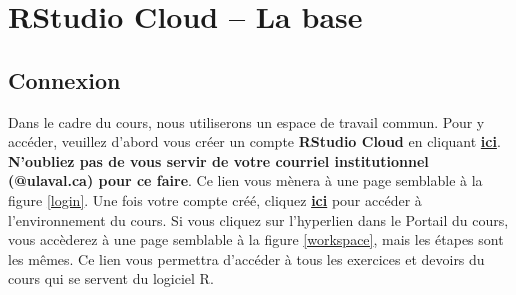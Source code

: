 \documentclass[10.5pt,a4paper]{article}
\begin{document}
\section{RStudio Cloud -- La base}
  \subsection{Connexion}
  Dans le cadre du cours, nous utiliserons un espace de travail commun. Pour y accéder, veuillez d'abord vous créer un compte \textbf{RStudio Cloud} en cliquant \href{https://login.rstudio.cloud/register?redirect=https\%3A\%2F\%2Fclient.login.rstudio.cloud\%2Foauth\%2Flogin\%3Fshow_auth\%3D0\%26show_login\%3D0\%26show_setup\%3D0}{\textbf{ici}}. \textbf{N'oubliez pas de vous servir de votre courriel institutionnel (@ulaval.ca) pour ce faire}. Ce lien vous mènera à une page semblable à la figure \ref{login}. Une fois votre compte créé, cliquez \href{https://can01.safelinks.protection.outlook.com/?url=https\%3A\%2F\%2Flogin.rstudio.cloud\%2Finvite\%3Fspace_name\%3DPOL\%2B2000-Z\%2BM\%25C3\%25A9thodes\%2Bquantitatives\%26code\%3D9tltN\%252ByVLqitCL1rVgCB\%252F\%252B0V8rk0Wtqxp\%252Fl6uW8J&amp;data=04\%7C01\%7Cwilliam.poirier.1\%40ulaval.ca\%7C9119a0b3a3fa4119007208d987439312\%7C56778bd56a3f4bd3a26593163e4d5bfe\%7C1\%7C0\%7C637689547430424200\%7CUnknown\%7CTWFpbGZsb3d8eyJWIjoiMC4wLjAwMDAiLCJQIjoiV2luMzIiLCJBTiI6Ik1haWwiLCJXVCI6Mn0\%3D\%7C0&amp;sdata=EMbletbv2\%2Bu9\%2FKSqkqJbRadybcaee2t2S2\%2F8MNRvJgQ\%3D&amp;reserved=0}{\textbf{ici}} pour accéder à l'environnement du cours. Si vous cliquez sur l’hyperlien dans le Portail du cours, vous accèderez à une page semblable à la figure \ref{workspace}, mais les étapes sont les mêmes. Ce lien vous permettra d'accéder à tous les exercices et devoirs du cours qui se servent du logiciel R.
  
\end{document}
